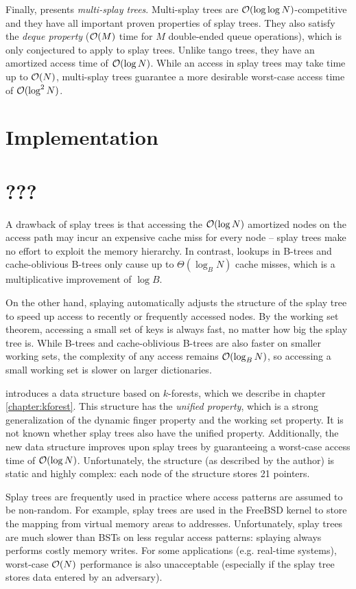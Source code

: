 Finally, \cite{multisplay-trees} presents \emph{multi-splay trees}.
Multi-splay trees are $\mathcal{O}(\log\log N)$-competitive and they have all important
proven properties of splay trees. They also satisfy the \emph{deque property}
($\mathcal{O}(M)$ time for $M$ double-ended queue operations), which is only conjectured
to apply to splay trees.
Unlike tango trees, they have an amortized access time of $\mathcal{O}(\log N)$.
While an access in splay trees may take time up to $\mathcal{O}(N)$, multi-splay trees
guarantee a more desirable worst-case access time of $\mathcal{O}(\log^2 N)$.
\section{Implementation}

\section{???}
A drawback of splay trees is that accessing the $\mathcal{O}(\log N)$ amortized
nodes on the access path may incur an expensive cache miss for every node --
splay trees make no effort to exploit the memory hierarchy.
In contrast, lookups in B-trees and cache-oblivious B-trees
only cause up to $\Theta(\log_B N)$ cache misses, which is a multiplicative
improvement of $\log B$.

On the other hand, splaying automatically adjusts the structure of the splay
tree to speed up access to recently or frequently accessed nodes. By the
working set theorem, accessing a small set of keys is always fast, no matter
how big the splay tree is. While B-trees and cache-oblivious B-trees are
also faster on smaller working sets, the complexity of any access remains
$\mathcal{O}(\log_B N)$, so accessing a small working set is slower on larger
dictionaries.

\cite{alternatives-to-splay-trees} introduces a data structure based
on $k$-forests, which we describe in chapter \ref{chapter:kforest}.
This structure has the \emph{unified property}, which is a strong
generalization of the dynamic finger property and the working set property.
It is not known whether splay trees also have the unified property.
Additionally, the new data structure improves upon splay trees by guaranteeing
a worst-case access time of $\mathcal{O}(\log N)$. Unfortunately, the structure
(as described by the author) is static and highly complex: each node of
the structure stores 21 pointers.

Splay trees are frequently used in practice where access patterns are assumed
to be non-random. For example, splay trees are used in the FreeBSD kernel
to store the mapping from virtual memory areas to
addresses\cite{freebsd-vm-splay}. %
Unfortunately, splay trees are much slower than BSTs on less
regular access patterns: splaying always performs costly memory writes.
For some applications (e.g. real-time systems), worst-case $\mathcal{O}(N)$ performance
is also unacceptable (especially if the splay tree stores data entered by
an adversary).
